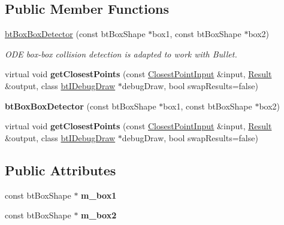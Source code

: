 \subsection*{Public Member Functions}
\begin{DoxyCompactItemize}
\item 
\mbox{\label{structbtBoxBoxDetector_a9ab1be9748aeb7cfceb274768910c895}} 
\hyperlink{structbtBoxBoxDetector_a9ab1be9748aeb7cfceb274768910c895}{bt\+Box\+Box\+Detector} (const bt\+Box\+Shape $\ast$box1, const bt\+Box\+Shape $\ast$box2)
\begin{DoxyCompactList}\small\item\em O\+DE box-\/box collision detection is adapted to work with Bullet. \end{DoxyCompactList}\item 
\mbox{\label{structbtBoxBoxDetector_a5718cdb1491b53850c928a4185844cbf}} 
virtual void {\bfseries get\+Closest\+Points} (const \hyperlink{structbtDiscreteCollisionDetectorInterface_1_1ClosestPointInput}{Closest\+Point\+Input} \&input, \hyperlink{structbtDiscreteCollisionDetectorInterface_1_1Result}{Result} \&output, class \hyperlink{classbtIDebugDraw}{bt\+I\+Debug\+Draw} $\ast$debug\+Draw, bool swap\+Results=false)
\item 
\mbox{\label{structbtBoxBoxDetector_a9ab1be9748aeb7cfceb274768910c895}} 
{\bfseries bt\+Box\+Box\+Detector} (const bt\+Box\+Shape $\ast$box1, const bt\+Box\+Shape $\ast$box2)
\item 
\mbox{\label{structbtBoxBoxDetector_a36203482d9da0ab0b876044737916a70}} 
virtual void {\bfseries get\+Closest\+Points} (const \hyperlink{structbtDiscreteCollisionDetectorInterface_1_1ClosestPointInput}{Closest\+Point\+Input} \&input, \hyperlink{structbtDiscreteCollisionDetectorInterface_1_1Result}{Result} \&output, class \hyperlink{classbtIDebugDraw}{bt\+I\+Debug\+Draw} $\ast$debug\+Draw, bool swap\+Results=false)
\end{DoxyCompactItemize}
\subsection*{Public Attributes}
\begin{DoxyCompactItemize}
\item 
\mbox{\label{structbtBoxBoxDetector_a01f6672da80afeed33008ead8adb0dba}} 
const bt\+Box\+Shape $\ast$ {\bfseries m\+\_\+box1}
\item 
\mbox{\label{structbtBoxBoxDetector_ab024a57cc0d7b37b31ce0d563b58c7bc}} 
const bt\+Box\+Shape $\ast$ {\bfseries m\+\_\+box2}
\end{DoxyCompactItemize}


